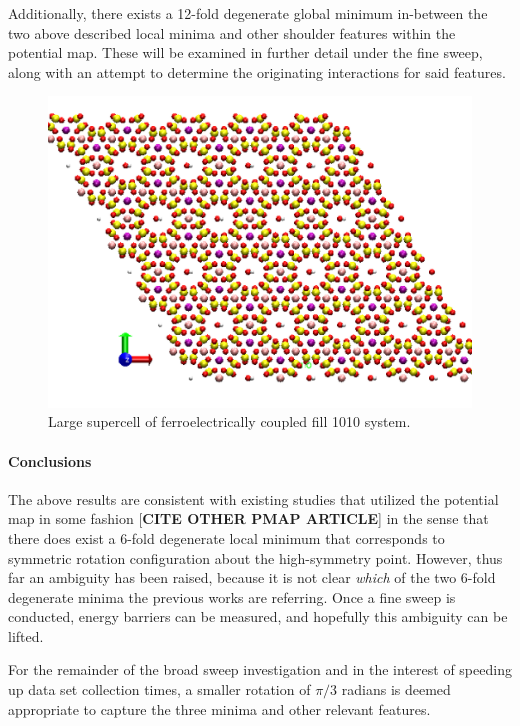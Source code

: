         Additionally, there exists a 12-fold degenerate global minimum in-between the two above described local minima and other shoulder features within the potential map. These will be examined in further detail under the fine sweep, along with an attempt to determine the originating interactions for said features.
        
        \begin{figure}
            \centering
            \includegraphics[width=0.8\linewidth]{Figures/System/supercell.png}
            \caption{Large supercell of ferroelectrically coupled fill 1010 system.}
            \label{fig:supercell}
        \end{figure}
        
        \paragraph{Conclusions} The above results are consistent with existing studies that utilized the potential map in some fashion \cite{vibr_states} [\textbf{CITE OTHER PMAP ARTICLE}] in the sense that there does exist a 6-fold degenerate local minimum that corresponds to symmetric rotation configuration about the high-symmetry point. However, thus far an ambiguity has been raised, because it is not clear \textit{which} of the two 6-fold degenerate minima the previous works are referring. Once a fine sweep is conducted, energy barriers can be measured, and hopefully this ambiguity can be lifted.
        
        For the remainder of the broad sweep investigation and in the interest of speeding up data set collection times, a smaller rotation of $\pi/3$ radians is deemed appropriate to capture the three minima and other relevant features. 
        
